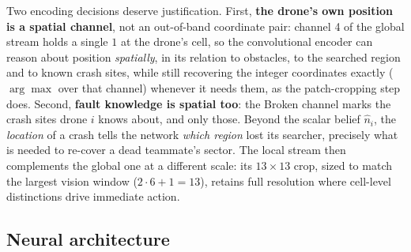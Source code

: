 Two encoding decisions deserve justification. First, \textbf{the drone's own
position is a spatial channel}, not an out-of-band coordinate pair: channel 4 of
the global stream holds a single $1$ at the drone's cell, so the convolutional
encoder can reason about position \emph{spatially}, in its relation to obstacles,
to the searched region and to known crash sites, while still recovering the
integer coordinates exactly ($\arg\max$ over that channel) whenever it needs
them, as the patch-cropping step does. Second, \textbf{fault knowledge is spatial
too}: the Broken channel marks the crash sites drone $i$ knows about, and only
those. Beyond the scalar belief $\hat n_i$, the \emph{location} of a crash tells
the network \emph{which region} lost its searcher, precisely what is needed to
re-cover a dead teammate's sector. The local stream then complements the global
one at a different scale: its $13\times13$ crop, sized to match the largest
vision window ($2\cdot6+1 = 13$), retains full resolution where cell-level
distinctions drive immediate action.

\subsection{Neural architecture}
\label{subsec:arch-network}

